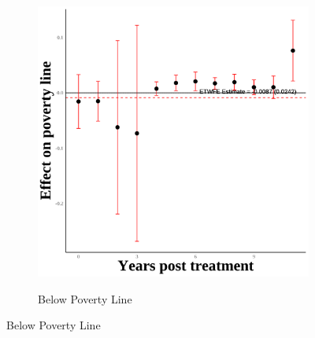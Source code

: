 \documentclass[12pt,english]{article}
\begin{document}
\begin{figure}[H]
\begin{subfigure}[b]{0.3\textwidth}
    \label{fig:snap-secgen-hw}
  \end{subfigure}
  \hfill
  \begin{subfigure}[b]{0.3\textwidth}
    \centering
    \caption{Below Poverty Line}
    \includegraphics[width=\linewidth]{figures/plot39-poverty_line_event_study-secgen-hw.png}
    \label{fig:poverty-line-secgen-hw}
  \end{subfigure}

  \vspace{0.3cm} %


\end{figure}
\end{document}
